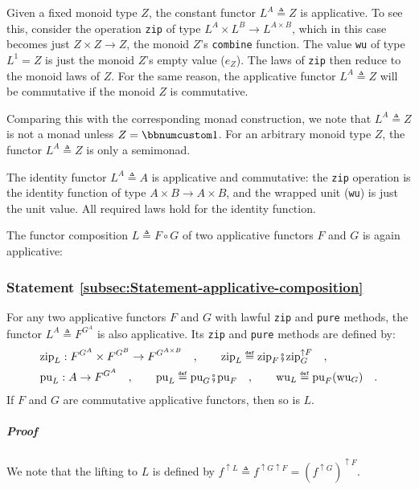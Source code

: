 Given a fixed monoid type $Z$, the constant functor $L^{A}\triangleq Z$
is applicative. To see this, consider the operation \lstinline!zip!
of type $L^{A}\times L^{B}\rightarrow L^{A\times B}$, which in this
case becomes just $Z\times Z\rightarrow Z$, the monoid $Z$\textsf{'}s \lstinline!combine!
function. The value \lstinline!wu! of type $L^{1}=Z$ is just the
monoid $Z$\textsf{'}s empty value ($e_{Z}$). The laws of \lstinline!zip!
then reduce to the monoid laws of $Z$. For the same reason, the applicative
functor $L^{A}\triangleq Z$ will be commutative if the monoid $Z$
is commutative.

Comparing this with the corresponding monad construction, we note
that $L^{A}\triangleq Z$ is not a monad unless $Z=\bbnum 1$. For
an arbitrary monoid type $Z$, the functor $L^{A}\triangleq Z$ is
only a semimonad.

The identity functor $L^{A}\triangleq A$ is applicative and commutative:
the \lstinline!zip! operation is the identity function of type $A\times B\rightarrow A\times B$,
and the wrapped unit (\lstinline!wu!) is just the unit value. All
required laws hold for the identity function.

The functor composition $L\triangleq F\circ G$ of two applicative
functors $F$ and $G$ is again applicative:

\subsubsection{Statement \label{subsec:Statement-applicative-composition}\ref{subsec:Statement-applicative-composition}}

For any two applicative functors $F$ and $G$ with lawful \lstinline!zip!
and \lstinline!pure! methods, the functor $L^{A}\triangleq F^{G^{A}}$
is also applicative. Its \lstinline!zip! and \lstinline!pure! methods
are defined by:
\begin{align*}
 & \text{zip}_{L}:F^{G^{A}}\times F^{G^{B}}\rightarrow F^{G^{A\times B}}\quad,\quad\quad\text{zip}_{L}\triangleq\text{zip}_{F}\bef\text{zip}_{G}^{\uparrow F}\quad,\\
 & \text{pu}_{L}:A\rightarrow F^{G^{A}}\quad,\quad\quad\text{pu}_{L}\triangleq\text{pu}_{G}\bef\text{pu}_{F}\quad,\quad\quad\text{wu}_{L}\triangleq\text{pu}_{F}(\text{wu}_{G})\quad.
\end{align*}
If $F$ and $G$ are commutative applicative functors, then so is
$L$.

\subparagraph{Proof}

We note that the lifting to $L$ is defined by $f^{\uparrow L}\triangleq f^{\uparrow G\uparrow F}=(f^{\uparrow G})^{\uparrow F}$.

